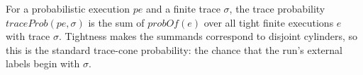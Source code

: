 \begin{definition}
  \label{def:traceprob}
  \leanok
  For a probabilistic execution $pe$ and a finite trace $\sigma$, the trace probability $traceProb(pe, \sigma)$ is the sum of $probOf(e)$ over all tight finite executions $e$ with trace $\sigma$.
  Tightness makes the summands correspond to disjoint cylinders, so this is the standard trace-cone probability: the chance that the run's external labels begin with $\sigma$.
\end{definition}
